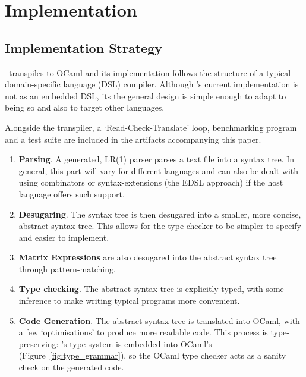 \section{Implementation}\label{sec:implementation}

\subsection{Implementation Strategy}

\lang\ transpiles to OCaml and its implementation follows the structure of a
typical domain-specific language (DSL) compiler. Although \lang's current
implementation is not as an embedded DSL, its the general design is simple enough
to adapt to being so and also to target other languages.

Alongside the transpiler, a `Read-Check-Translate' loop, benchmarking program
and a test suite are included in the artifacts accompanying this paper.

\begin{enumerate}

    \item \textbf{Parsing}. A generated, LR(1) parser parses a text file into a
        syntax tree. In general, this part will vary for different languages
        and can also be dealt with using combinators or syntax-extensions (the
        EDSL approach) if the host language offers such support.

    \item \textbf{Desugaring}. The syntax tree is then desugared into a
        smaller, more concise, abstract syntax tree. This allows for the type
        checker to be simpler to specify and easier to implement.

    \item \textbf{Matrix Expressions} are also desugared into the abstract
        syntax tree through pattern-matching.

    \item \textbf{Type checking}. The abstract syntax tree is explicitly typed,
        with some inference to make writing typical programs more convenient.

    \item \textbf{Code Generation}. The abstract syntax tree is translated into
        OCaml, with a few `optimisations' to produce more readable code. This
        process is type-preserving: \lang's type system is embedded into
        OCaml's (Figure~\ref{fig:type_grammar}), so the OCaml type checker
        acts as a sanity check on the generated code.

\end{enumerate}

